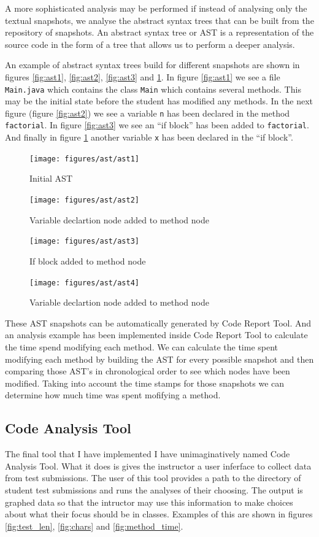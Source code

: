 \documentclass[twocolumn]{article}
\begin{document}
A more sophisticated analysis may be performed if instead of analysing only the
textual snapshots, we analyse the abstract syntax trees that can be built from
the repository of snapshots. An abstract syntax tree or AST is a representation
of the source code in the form of a tree that allows us to perform a deeper
analysis.

An example of abstract syntax trees build for different snapshots are shown in
figures \ref{fig:ast1}, \ref{fig:ast2}, \ref{fig:ast3} and \ref{fig:ast4}. In
figure \ref{fig:ast1} we see a file \texttt{Main.java} which contains the class
\texttt{Main} which contains several methods. This may be the initial state
before the student has modified any methods. In the next figure (figure
\ref{fig:ast2}) we see a variable \texttt{n} has been declared in the method
\texttt{factorial}. In figure \ref{fig:ast3} we see an ``if block'' has been added
to \texttt{factorial}. And finally in figure \ref{fig:ast4} another variable
\texttt{x} has been declared in the ``if block''.

\begin{figure}[h!bt]
\centering
\texttt{[image: figures/ast/ast1]}
\caption{Initial AST}
\label{fig:ast1}
\centering
\texttt{[image: figures/ast/ast2]}
\caption{Variable declartion node added to method node}
\label{fig:ast2}
\centering
\texttt{[image: figures/ast/ast3]}
\caption{If block added to method node}
\label{fig:ast3}
\centering
\texttt{[image: figures/ast/ast4]}
\caption{Variable declartion node added to method node}
\label{fig:ast4}
\end{figure}

These AST snapshots can be automatically generated by Code Report Tool. And an
analysis example has been implemented inside Code Report Tool to calculate the
time spend modifying each method. We can calculate the time spent modifying
each method by building the AST for every possible snapshot and then comparing
those AST's in chronological order to see which nodes have been modified.
Taking into account the time stamps for those snapshots we can determine how
much time was spent mofifying a method.

\subsection{Code Analysis Tool}
The final tool that I have implemented I have unimaginatively named Code
Analysis Tool. What it does is gives the instructor a user inferface to collect
data from test submissions. The user of this tool provides a path to the
directory of student test submissions and runs the analyses of their choosing.
The output is graphed data so that the intructor may use this information to
make choices about what their focus should be in classes. Examples of this are
shown in figures \ref{fig:test_len}, \ref{fig:chars} and \ref{fig:method_time}.
\end{document}
